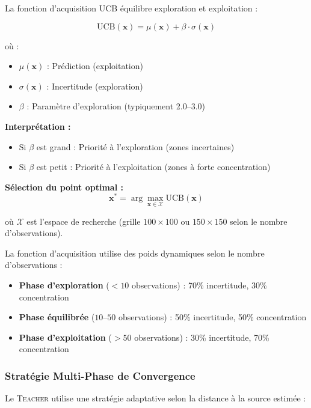 \documentclass[12pt,a4paper]{article}
\newcommand{\teacher}{\textsc{Teacher}}
\begin{document}
La fonction d'acquisition UCB équilibre exploration et exploitation :

\begin{equation}
\text{UCB}(\mathbf{x}) = \mu(\mathbf{x}) + \beta \cdot \sigma(\mathbf{x})
\end{equation}

où :
\begin{itemize}
    \item $\mu(\mathbf{x})$ : Prédiction (exploitation)
    \item $\sigma(\mathbf{x})$ : Incertitude (exploration)
    \item $\beta$ : Paramètre d'exploration (typiquement 2.0--3.0)
\end{itemize}

\textbf{Interprétation :}
\begin{itemize}
    \item Si $\beta$ est grand : Priorité à l'exploration (zones incertaines)
    \item Si $\beta$ est petit : Priorité à l'exploitation (zones à forte concentration)
\end{itemize}

\textbf{Sélection du point optimal :}
\begin{equation}
\mathbf{x}^* = \arg\max_{\mathbf{x} \in \mathcal{X}} \text{UCB}(\mathbf{x})
\end{equation}

où $\mathcal{X}$ est l'espace de recherche (grille $100 \times 100$ ou $150 \times 150$ selon le nombre d'observations).

La fonction d'acquisition utilise des poids dynamiques selon le nombre d'observations :
\begin{itemize}
    \item \textbf{Phase d'exploration} ($< 10$ observations) : 70\% incertitude, 30\% concentration
    \item \textbf{Phase équilibrée} ($10$--$50$ observations) : 50\% incertitude, 50\% concentration
    \item \textbf{Phase d'exploitation} ($> 50$ observations) : 30\% incertitude, 70\% concentration
\end{itemize}

\subsubsection{Stratégie Multi-Phase de Convergence}

Le \teacher{} utilise une stratégie adaptative selon la distance à la source estimée :
\end{document}
